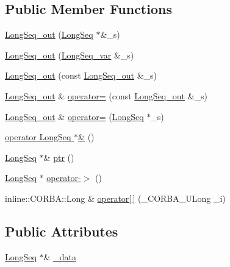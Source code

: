 \subsection*{Public Member Functions}
\begin{DoxyCompactItemize}
\item 
\hyperlink{class_long_seq__out_a87e486168fa56b6a9646dcd02e255d5c}{Long\+Seq\+\_\+out} (\hyperlink{class_long_seq}{Long\+Seq} $\ast$\&\+\_\+s)
\item 
\hyperlink{class_long_seq__out_a1faf48dd0592f3019ff6d647e409ab9e}{Long\+Seq\+\_\+out} (\hyperlink{class_long_seq__var}{Long\+Seq\+\_\+var} \&\+\_\+s)
\item 
\hyperlink{class_long_seq__out_a26bbab2ccdcc560d4d2c561f7e990df8}{Long\+Seq\+\_\+out} (const \hyperlink{class_long_seq__out}{Long\+Seq\+\_\+out} \&\+\_\+s)
\item 
\hyperlink{class_long_seq__out}{Long\+Seq\+\_\+out} \& \hyperlink{class_long_seq__out_a7a667bf16be926b3c96820a550c36c62}{operator=} (const \hyperlink{class_long_seq__out}{Long\+Seq\+\_\+out} \&\+\_\+s)
\item 
\hyperlink{class_long_seq__out}{Long\+Seq\+\_\+out} \& \hyperlink{class_long_seq__out_a8aacb7abbf3e53e2159b3d350463837e}{operator=} (\hyperlink{class_long_seq}{Long\+Seq} $\ast$\+\_\+s)
\item 
\hyperlink{class_long_seq__out_a114a8d10ff95c2c1fccf196ffe287a32}{operator Long\+Seq $\ast$\&} ()
\item 
\hyperlink{class_long_seq}{Long\+Seq} $\ast$\& \hyperlink{class_long_seq__out_a4d4e70af09b04cb647b78717871c4944}{ptr} ()
\item 
\hyperlink{class_long_seq}{Long\+Seq} $\ast$ \hyperlink{class_long_seq__out_a151ea23d3664c170a5447b36001ec8d1}{operator-\/$>$} ()
\item 
inline\+::\+C\+O\+R\+B\+A\+::\+Long \& \hyperlink{class_long_seq__out_a33e9dde37d66100e290524f00740ec96}{operator\mbox{[}$\,$\mbox{]}} (\+\_\+\+C\+O\+R\+B\+A\+\_\+\+U\+Long \+\_\+i)
\end{DoxyCompactItemize}
\subsection*{Public Attributes}
\begin{DoxyCompactItemize}
\item 
\hyperlink{class_long_seq}{Long\+Seq} $\ast$\& \hyperlink{class_long_seq__out_a58e06f54c45bad600b77383a4229b539}{\+\_\+data}
\end{DoxyCompactItemize}


